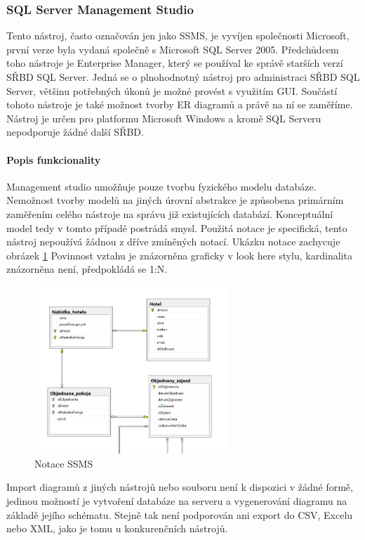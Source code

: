 \documentclass[czech,bachelor,public,dept460,male,oneside]{diploma}
\begin{document}
		\subsubsection{SQL Server Management Studio}
		Tento nástroj, často označován jen jako SSMS, je vyvíjen společnosti Microsoft, první verze byla vydaná společně s Microsoft SQL Server 2005. Předchůdcem toho nástroje je Enterprise Manager, který se používal ke správě starších verzí SŘBD SQL Server. Jedná se o plnohodnotný nástroj pro administraci SŘBD SQL Server, většinu potřebných úkonů je možné provést s využitím GUI. Součástí tohoto nástroje je také možnost tvorby ER diagramů a právě na ní se zaměříme. Nástroj je určen pro platformu Microsoft Windows a kromě SQL Serveru nepodporuje žádné další SŘBD.
		
		\paragraph{Popis funkcionality}
		Management studio umožňuje pouze tvorbu fyzického modelu databáze. Nemožnost tvorby modelů na jiných úrovní abstrakce je způsobena primárním zaměřením celého nástroje na správu již existujících databází. Konceptuální model tedy v tomto případě postrádá smysl. Použitá notace je specifická, tento nástroj nepoužívá žádnou z dříve zmíněných notací. Ukázku notace zachycuje obrázek \ref{fig:notSSMS} Povinnost vztahu je znázorněna graficky v look here stylu, kardinalita znázorněna není, předpokládá se 1:N. 
		
		\begin{figure}[!h]
			\centering
			\includegraphics[width=0.65\textwidth]{Figures/EditorSSMS}
			\caption[Notace SSMS]{Notace SSMS}
			\label{fig:notSSMS}
		\end{figure}
		
		Import diagramů z jiných nástrojů nebo souboru není k dispozici v žádné formě, jedinou možností je vytvoření databáze na serveru a vygenerování diagramu na základě jejího schématu. Stejně tak není podporován ani export do CSV, Excelu nebo XML, jako je tomu u konkurenčních nástrojů. 
		
\end{document}
